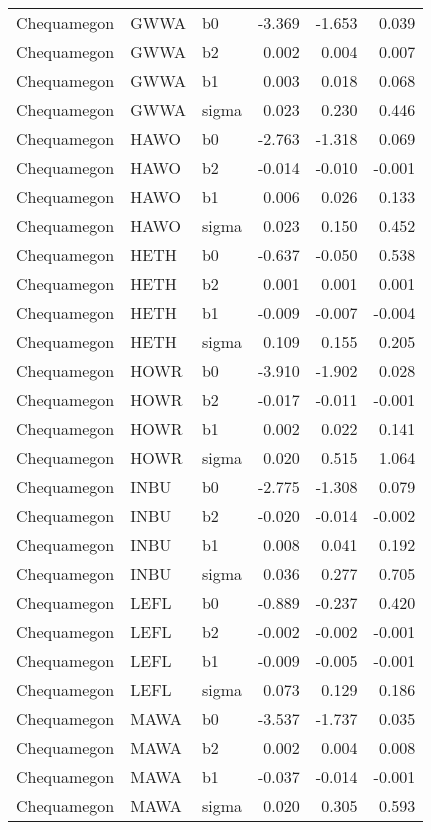 \begin{table}[ht]
\begin{center}
\begin{tabular}{lllrrr}
  Chequamegon & GWWA & b0 & -3.369 & -1.653 & 0.039 \\ 
  Chequamegon & GWWA & b2 & 0.002 & 0.004 & 0.007 \\ 
  Chequamegon & GWWA & b1 & 0.003 & 0.018 & 0.068 \\ 
  Chequamegon & GWWA & sigma & 0.023 & 0.230 & 0.446 \\ 
  Chequamegon & HAWO & b0 & -2.763 & -1.318 & 0.069 \\ 
  Chequamegon & HAWO & b2 & -0.014 & -0.010 & -0.001 \\ 
  Chequamegon & HAWO & b1 & 0.006 & 0.026 & 0.133 \\ 
  Chequamegon & HAWO & sigma & 0.023 & 0.150 & 0.452 \\ 
  Chequamegon & HETH & b0 & -0.637 & -0.050 & 0.538 \\ 
  Chequamegon & HETH & b2 & 0.001 & 0.001 & 0.001 \\ 
  Chequamegon & HETH & b1 & -0.009 & -0.007 & -0.004 \\ 
  Chequamegon & HETH & sigma & 0.109 & 0.155 & 0.205 \\ 
  Chequamegon & HOWR & b0 & -3.910 & -1.902 & 0.028 \\ 
  Chequamegon & HOWR & b2 & -0.017 & -0.011 & -0.001 \\ 
  Chequamegon & HOWR & b1 & 0.002 & 0.022 & 0.141 \\ 
  Chequamegon & HOWR & sigma & 0.020 & 0.515 & 1.064 \\ 
  Chequamegon & INBU & b0 & -2.775 & -1.308 & 0.079 \\ 
  Chequamegon & INBU & b2 & -0.020 & -0.014 & -0.002 \\ 
  Chequamegon & INBU & b1 & 0.008 & 0.041 & 0.192 \\ 
  Chequamegon & INBU & sigma & 0.036 & 0.277 & 0.705 \\ 
  Chequamegon & LEFL & b0 & -0.889 & -0.237 & 0.420 \\ 
  Chequamegon & LEFL & b2 & -0.002 & -0.002 & -0.001 \\ 
  Chequamegon & LEFL & b1 & -0.009 & -0.005 & -0.001 \\ 
  Chequamegon & LEFL & sigma & 0.073 & 0.129 & 0.186 \\ 
  Chequamegon & MAWA & b0 & -3.537 & -1.737 & 0.035 \\ 
  Chequamegon & MAWA & b2 & 0.002 & 0.004 & 0.008 \\ 
  Chequamegon & MAWA & b1 & -0.037 & -0.014 & -0.001 \\ 
  Chequamegon & MAWA & sigma & 0.020 & 0.305 & 0.593 \\ 

\end{tabular}
\end{center}
\end{table}
